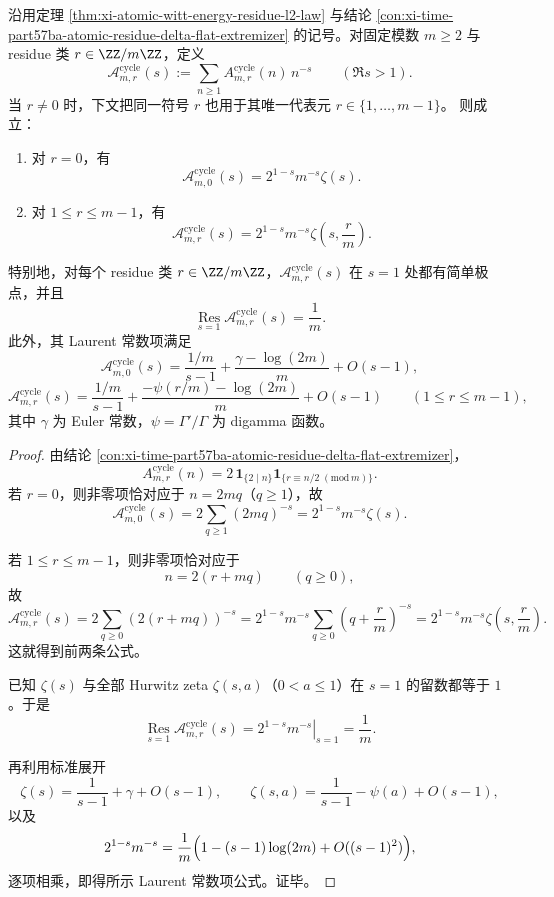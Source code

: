 \begin{theorem}\label{thm:xi-time-part77-atomic-residue-dirichlet-hurwitz-shell}
沿用定理 \ref{thm:xi-atomic-witt-energy-residue-l2-law} 与结论 \ref{con:xi-time-part57ba-atomic-residue-delta-flat-extremizer} 的记号。对固定模数 \(m\ge 2\) 与 residue 类 \(r\in \ZZ/m\ZZ\)，定义
\[
\mathcal A^{\mathrm{cycle}}_{m,r}(s)
:=
\sum_{n\ge 1}A^{\mathrm{cycle}}_{m,r}(n)\,n^{-s}
\qquad (\Re s>1).
\]
当 \(r\neq 0\) 时，下文把同一符号 \(r\) 也用于其唯一代表元 \(r\in\{1,\dots,m-1\}\)。
则成立：
\begin{enumerate}
  \item 对 \(r=0\)，有
  \[
  \mathcal A^{\mathrm{cycle}}_{m,0}(s)
  =
  2^{1-s}m^{-s}\zeta(s).
  \]
  \item 对 \(1\le r\le m-1\)，有
  \[
  \mathcal A^{\mathrm{cycle}}_{m,r}(s)
  =
  2^{1-s}m^{-s}\zeta\!\left(s,\frac{r}{m}\right).
  \]
\end{enumerate}
特别地，对每个 residue 类 \(r\in \ZZ/m\ZZ\)，\(\mathcal A^{\mathrm{cycle}}_{m,r}(s)\) 在 \(s=1\) 处都有简单极点，并且
\[
\operatorname*{Res}_{s=1}\mathcal A^{\mathrm{cycle}}_{m,r}(s)=\frac{1}{m}.
\]
此外，其 Laurent 常数项满足
\[
\mathcal A^{\mathrm{cycle}}_{m,0}(s)
=
\frac{1/m}{s-1}
+\frac{\gamma-\log(2m)}{m}
+O(s-1),
\]
\[
\mathcal A^{\mathrm{cycle}}_{m,r}(s)
=
\frac{1/m}{s-1}
+\frac{-\psi(r/m)-\log(2m)}{m}
+O(s-1)
\qquad (1\le r\le m-1),
\]
其中 \(\gamma\) 为 Euler 常数，\(\psi=\Gamma'/\Gamma\) 为 digamma 函数。
\end{theorem}
\begin{proof}
由结论 \ref{con:xi-time-part57ba-atomic-residue-delta-flat-extremizer}，
\[
A_{m,r}^{\mathrm{cycle}}(n)
=
2\,\mathbf 1_{\{2\mid n\}}\mathbf 1_{\{r\equiv n/2\;(\mathrm{mod}\,m)\}}.
\]
若 \(r=0\)，则非零项恰对应于 \(n=2mq\)（\(q\ge 1\)），故
\[
\mathcal A^{\mathrm{cycle}}_{m,0}(s)
=
2\sum_{q\ge 1}(2mq)^{-s}
=
2^{1-s}m^{-s}\zeta(s).
\]

若 \(1\le r\le m-1\)，则非零项恰对应于
\[
n=2(r+mq)\qquad (q\ge 0),
\]
故
\[
\mathcal A^{\mathrm{cycle}}_{m,r}(s)
=
2\sum_{q\ge 0}(2(r+mq))^{-s}
=
2^{1-s}m^{-s}\sum_{q\ge 0}\left(q+\frac{r}{m}\right)^{-s}
=
2^{1-s}m^{-s}\zeta\!\left(s,\frac{r}{m}\right).
\]
这就得到前两条公式。

已知 \(\zeta(s)\) 与全部 Hurwitz zeta \(\zeta(s,a)\)（\(0<a\le 1\)）在 \(s=1\) 的留数都等于 \(1\)。于是
\[
\operatorname*{Res}_{s=1}\mathcal A^{\mathrm{cycle}}_{m,r}(s)
=
\left.2^{1-s}m^{-s}\right|_{s=1}
=
\frac{1}{m}.
\]

再利用标准展开
\[
\zeta(s)=\frac{1}{s-1}+\gamma+O(s-1),
\qquad
\zeta(s,a)=\frac{1}{s-1}-\psi(a)+O(s-1),
\]
以及
\[
2^{1-s}m^{-s}
=
\frac{1}{m}\Bigl(1-(s-1)\log(2m)+O((s-1)^2)\Bigr),
\]
逐项相乘，即得所示 Laurent 常数项公式。证毕。
\end{proof}

